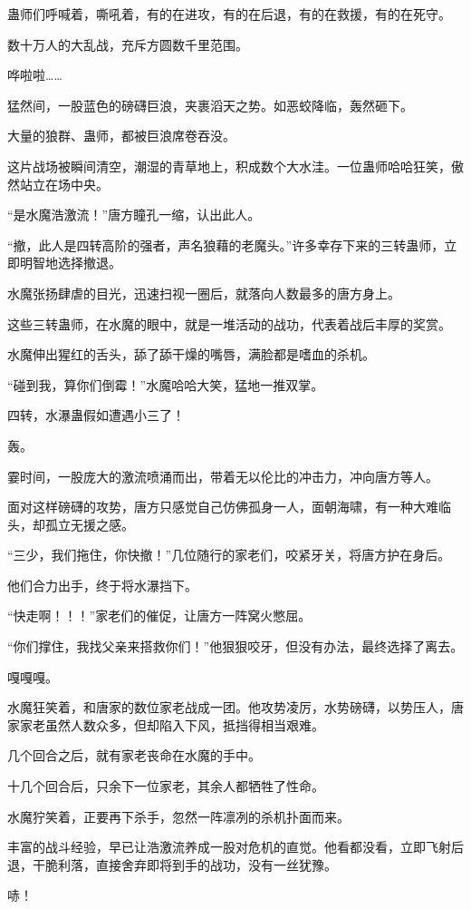 \begin{this_body}
蛊师们呼喊着，嘶吼着，有的在进攻，有的在后退，有的在救援，有的在死守。

数十万人的大乱战，充斥方圆数千里范围。

哗啦啦……

猛然间，一股蓝色的磅礴巨浪，夹裹滔天之势。如恶蛟降临，轰然砸下。

大量的狼群、蛊师，都被巨浪席卷吞没。

这片战场被瞬间清空，潮湿的青草地上，积成数个大水洼。一位蛊师哈哈狂笑，傲然站立在场中央。

“是水魔浩激流！”唐方瞳孔一缩，认出此人。

“撤，此人是四转高阶的强者，声名狼藉的老魔头。”许多幸存下来的三转蛊师，立即明智地选择撤退。

水魔张扬肆虐的目光，迅速扫视一圈后，就落向人数最多的唐方身上。

这些三转蛊师，在水魔的眼中，就是一堆活动的战功，代表着战后丰厚的奖赏。

水魔伸出猩红的舌头，舔了舔干燥的嘴唇，满脸都是嗜血的杀机。

“碰到我，算你们倒霉！”水魔哈哈大笑，猛地一推双掌。

四转，水瀑蛊假如遭遇小三了！

轰。

霎时间，一股庞大的激流喷涌而出，带着无以伦比的冲击力，冲向唐方等人。

面对这样磅礴的攻势，唐方只感觉自己仿佛孤身一人，面朝海啸，有一种大难临头，却孤立无援之感。

“三少，我们拖住，你快撤！”几位随行的家老们，咬紧牙关，将唐方护在身后。

他们合力出手，终于将水瀑挡下。

“快走啊！！！”家老们的催促，让唐方一阵窝火憋屈。

“你们撑住，我找父亲来搭救你们！”他狠狠咬牙，但没有办法，最终选择了离去。

嘎嘎嘎。

水魔狂笑着，和唐家的数位家老战成一团。他攻势凌厉，水势磅礴，以势压人，唐家家老虽然人数众多，但却陷入下风，抵挡得相当艰难。

几个回合之后，就有家老丧命在水魔的手中。

十几个回合后，只余下一位家老，其余人都牺牲了性命。

水魔狞笑着，正要再下杀手，忽然一阵凛冽的杀机扑面而来。

丰富的战斗经验，早已让浩激流养成一股对危机的直觉。他看都没看，立即飞射后退，干脆利落，直接舍弃即将到手的战功，没有一丝犹豫。

哧！


\end{this_body}
